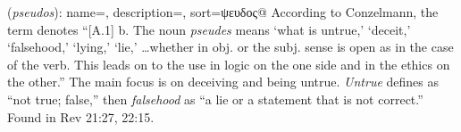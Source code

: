 \item[Falsehood,]

(\textit{pseudos}):
{
    name=,
    description={},
    sort=ψευδος@
}
According to Conzelmann, the term denotes ``[A.1] b. The noun \emph{pseudes} means `what is untrue,' `deceit,' `falsehood,' `lying,' `lie,' \ldots whether in obj. or the subj. sense is open as in the case of the verb. This leads on to the use in logic on the one side and in the ethics on the other.''
The main focus is on deceiving and being untrue. \emph{Untrue} defines as ``not true; false,'' then \emph{falsehood} as ``a lie or a statement that is not correct.''
Found in Rev 21:27, 22:15.
